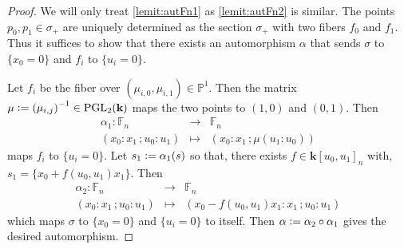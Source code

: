 \documentclass[a4paper,11pt]{amsart}
\def\PGL{\operatorname{PGL}}
\newcommand{\PP}{\mathbb{P}}
\renewcommand{\FF}{\mathbb{F}}
\newcommand{\kk}{\textbf{k}}
\newcommand{\defeq}{\vcentcolon=}
\begin{document}
\begin{proof}
	We will only treat \eqref{lemit:autFn1} as \eqref{lemit:autFn2} is similar.
	The points $p_0, p_1 \in \sigma_+$ are uniquely determined as the section $\sigma_+$ with two fibers $f_0$ and $f_1$.
	Thus it suffices to show that there exists an automorphism $\alpha$ that sends $\sigma$ to $\{x_0=0\}$ and $f_i$ to $\{u_i = 0\}$.
	
	Let $f_i$ be the fiber over $(\mu_{i,0},\mu_{i,1}) \in \PP^1$.
	Then the matrix $\mu \defeq \left(\mu_{i,j}\right)^{-1} \in \PGL_2(\kk)$ maps the two points to $(1,0)$ and $(0,1)$.
	Then 
	\[
	\begin{array}{ccc}
		\alpha_1 \colon \FF_n & \to &\FF_n\\
		(x_0:x_1\,; u_0:u_1) & \mapsto & (x_0:x_1\,; \mu(u_1:u_0))
	\end{array}
	\]
	maps $f_i$ to $\{u_i = 0\}$.
	Let $s_1 \defeq \alpha_1(s)$ so that, there exists $f \in \kk[u_0,u_1]_n$ with, $s_1 = \{x_0 + f(u_0,u_1)x_1\}$.
	Then
	\[
	\begin{array}{ccc}
		\alpha_2 \colon \FF_n & \to &\FF_n\\
		(x_0:x_1\,; u_0:u_1) & \mapsto & (x_0 - f(u_0,u_1)x_1:x_1\,; u_0:u_1)
	\end{array}
	\]
	which maps $\sigma$ to $\{x_0=0\}$ and $\{u_i = 0\}$ to itself.
	Then $\alpha \defeq \alpha_2\circ \alpha_1$ gives the desired automorphism. 
\end{proof}
\end{document}

